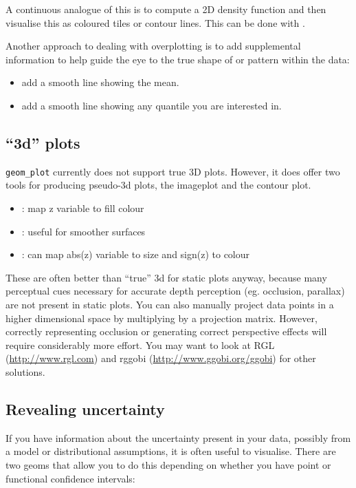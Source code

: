 A continuous analogue of this is to compute a 2D density function and then visualise this as coloured tiles or contour lines.  This can be done with .

Another approach to dealing with overplotting is to add supplemental information to help guide the eye to the true shape of or pattern within the data:

\begin{itemize}
	\item {} add a smooth line showing the mean.
	\item {} add a smooth line showing any quantile you are interested in.
\end{itemize}

\subsection{``3d'' plots}\label{sub:_3d_plots}

{\tt geom_plot} currently does not support true 3D plots.  However, it does offer two tools for producing pseudo-3d plots, the imageplot and the contour plot.

\begin{itemize}
	\item {}: map z variable to fill colour
	\item {}: useful for smoother surfaces
	\item {}: can map abs(z) variable to size and sign(z) to colour
\end{itemize}

These are often better than ``true'' 3d for static plots anyway, because many perceptual cues necessary for accurate depth perception (eg. occlusion, parallax) are not present in static plots.  You can also manually project data points in a higher dimensional space by multiplying by a projection matrix.  However, correctly representing occlusion or generating correct perspective effects will require considerably more effort.  You may want to look at RGL (\url{http://www.rgl.com}) and rggobi (\url{http://www.ggobi.org/ggobi}) for other solutions.

\subsection{Revealing uncertainty}\label{sub:displaying_uncertainty}

If you have information about the uncertainty present in your data, possibly from a model or distributional assumptions, it is often useful to visualise.  There are two geoms that allow you to do this depending on whether you have point or functional confidence intervals:

